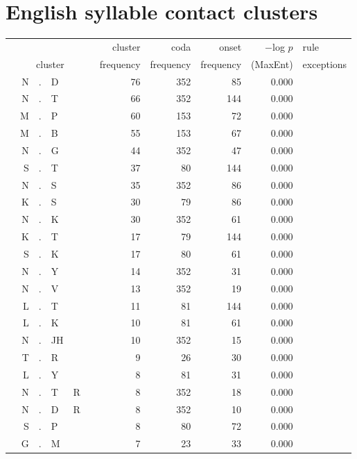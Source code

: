 \chapter{English syllable contact clusters} \label{appendixB}

\begin{longtable}{r@{ } r@{ } c@{ } l@{ } l@{ } l@{ } r r r r l }
\toprule
 &  &  &  &  &  &  cluster  &  coda  &  onset  &  $-$log $p$  &  rule \\
\multicolumn{6}{c}{cluster}  &  frequency  &  frequency  &  frequency  &  (MaxEnt)  &  exceptions\\ 
\midrule
  & N & . & D &   &   & 76 & 352 & 85 & 0.000 &  \\
  & N & . & T &   &   & 66 & 352 & 144 & 0.000 &  \\
  & M & . & P &   &   & 60 & 153 & 72 & 0.000 &  \\
  & M & . & B &   &   & 55 & 153 & 67 & 0.000 &  \\
  & N & . & G &   &   & 44 & 352 & 47 & 0.000 &  \\
  & S & . & T &   &   & 37 & 80 & 144 & 0.000 &  \\
  & N & . & S &   &   & 35 & 352 & 86 & 0.000 &  \\
  & K & . & S &   &   & 30 & 79 & 86 & 0.000 &  \\
  & N & . & K &   &   & 30 & 352 & 61 & 0.000 &  \\
  & K & . & T &   &   & 17 & 79 & 144 & 0.000 &  \\
  & S & . & K &   &   & 17 & 80 & 61 & 0.000 &  \\
  & N & . & Y &   &   & 14 & 352 & 31 & 0.000 &  \\
  & N & . & V &   &   & 13 & 352 & 19 & 0.000 &  \\
  & L & . & T &   &   & 11 & 81 & 144 & 0.000 &  \\
  & L & . & K &   &   & 10 & 81 & 61 & 0.000 &  \\
  & N & . & JH &   &   & 10 & 352 & 15 & 0.000 &  \\
  & T & . & R &   &   & 9 & 26 & 30 & 0.000 &  \\
  & L & . & Y &   &   & 8 & 81 & 31 & 0.000 &  \\
  & N & . & T & R &   & 8 & 352 & 18 & 0.000 &  \\
  & N & . & D & R &   & 8 & 352 & 10 & 0.000 &  \\
  & S & . & P &   &   & 8 & 80 & 72 & 0.000 &  \\
  & G & . & M &   &   & 7 & 23 & 33 & 0.000 &  \\

\end{longtable}
